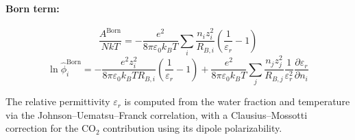 \documentclass[11pt]{article}
\begin{document}
\paragraph{Born term:}
\begin{equation}
  \frac{A^\mathrm{Born}}{NkT} = -\frac{e^2}{8\pi\varepsilon_0 k_B T}
    \sum_i \frac{n_i z_i^2}{R_{B,i}}\left(\frac{1}{\varepsilon_r} - 1\right)
\end{equation}
\begin{equation}
  \ln\hat{\phi}_i^\mathrm{Born} = -\frac{e^2 z_i^2}{8\pi\varepsilon_0 k_B T R_{B,i}}
    \left(\frac{1}{\varepsilon_r} - 1\right)
    + \frac{e^2}{8\pi\varepsilon_0 k_B T}\sum_j \frac{n_j z_j^2}{R_{B,j}}
    \frac{1}{\varepsilon_r^2}\frac{\partial \varepsilon_r}{\partial n_i}
\end{equation}

\noindent The relative permittivity $\varepsilon_r$ is computed from the water fraction and temperature
via the Johnson--Uematsu--Franck correlation, with a Clausius--Mossotti correction for the CO$_2$
contribution using its dipole polarizability.
\end{document}
